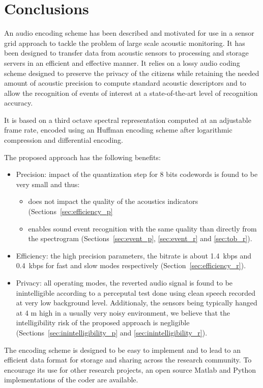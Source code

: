 \documentclass[sensors,article,accept,moreauthors,pdftex,10pt,a4paper]{mdpi}
\begin{document}
\section{Conclusions}

An audio encoding scheme has been described and motivated for use in a sensor grid approach to tackle the problem of large scale acoustic monitoring. It has been designed to transfer data from acoustic sensors to processing and storage servers in an efficient and effective manner. It relies on a lossy audio coding scheme designed to preserve the privacy of the citizens while retaining the needed amount of acoustic precision to compute standard acoustic descriptors and to allow the recognition of events of interest at a state-of-the-art level of recognition accuracy.

It is based on a third octave spectral representation computed at an adjustable frame rate, encoded using an Huffman encoding scheme after logarithmic compression and differential encoding.

The proposed approach has the following benefits:
\begin{itemize}[leftmargin=*,labelsep=5.5mm]
	\item Precision:  impact of the quantization step for 8 bits codewords is found to be very small  and thus:
	\begin{itemize}[leftmargin=*,labelsep=5.6mm]
	\item does not impact the quality of the acoustics indicators (Sections~\ref{sec:efficiency_p}  
	\item enables sound event recognition with the same quality than directly from the spectrogram (Sections~\ref{sec:event_p}, \ref{sec:event_r} and \ref{sec:tob_r}).
	\end{itemize}
	\item Efficiency:  the high precision parameters, the bitrate is about 1.4~kbps and 0.4~kbps for fast and slow modes respectively (Section~\ref{sec:efficiency_r}).
	\item Privacy:  all operating modes, the reverted audio signal is found to be inintelligible according to a perceputal test done using clean speech recorded at very low background level. Additionaly, the sensors being typically hanged at 4 m high in a usually very noisy environment, we believe that the intelligibility risk of the proposed approach is negligible (Sections~\ref{sec:inintelligibility_p} and \ref{sec:inintelligibility_r}).
\end{itemize}
The encoding scheme is designed to be easy to implement and to lead to an efficient data format for storage and sharing across the research community. To encourage its use for other research projects, an open source Matlab and Python implementations of the coder are available.
\end{document}
